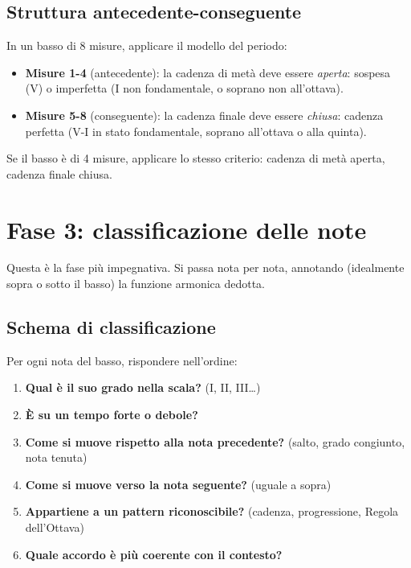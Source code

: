 \subsection{Struttura antecedente-conseguente}

In un basso di 8 misure, applicare il modello del periodo:
\begin{itemize}
	\item \textbf{Misure 1-4} (antecedente): la cadenza di metà deve essere \textit{aperta}: sospesa (V) o imperfetta (I non fondamentale, o soprano non all'ottava).
	\item \textbf{Misure 5-8} (conseguente): la cadenza finale deve essere \textit{chiusa}: cadenza perfetta (V-I in stato fondamentale, soprano all'ottava o alla quinta).
\end{itemize}

Se il basso è di 4 misure, applicare lo stesso criterio: cadenza di metà aperta, cadenza finale chiusa.

\section{Fase 3: classificazione delle note}
\label{sec:fase3_basso}

Questa è la fase più impegnativa. Si passa nota per nota, annotando (idealmente sopra o sotto il basso) la funzione armonica dedotta.

\subsection{Schema di classificazione}

Per ogni nota del basso, rispondere nell'ordine:

\begin{enumerate}
	\item \textbf{Qual è il suo grado nella scala?} (I, II, III\ldots)
	\item \textbf{È su un tempo forte o debole?}
	\item \textbf{Come si muove rispetto alla nota precedente?} (salto, grado congiunto, nota tenuta)
	\item \textbf{Come si muove verso la nota seguente?} (uguale a sopra)
	\item \textbf{Appartiene a un pattern riconoscibile?} (cadenza, progressione, Regola dell'Ottava)
	\item \textbf{Quale accordo è più coerente con il contesto?}
\end{enumerate}

